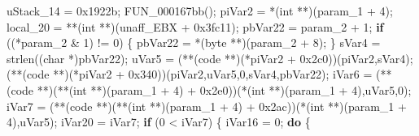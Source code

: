 \documentclass[
]{article}
\newenvironment{Shaded}{}{}
\newcommand{\BaseNTok}[1]{\textcolor[rgb]{0.25,0.63,0.44}{#1}}
\newcommand{\ControlFlowTok}[1]{\textcolor[rgb]{0.00,0.44,0.13}{\textbf{#1}}}
\newcommand{\DataTypeTok}[1]{\textcolor[rgb]{0.56,0.13,0.00}{#1}}
\newcommand{\DecValTok}[1]{\textcolor[rgb]{0.25,0.63,0.44}{#1}}
\newcommand{\NormalTok}[1]{#1}
\newcommand{\OperatorTok}[1]{\textcolor[rgb]{0.40,0.40,0.40}{#1}}
\begin{document}
\begin{Shaded}
\begin{Highlighting}[]
\NormalTok{  uStack\_14 }\OperatorTok{=} \BaseNTok{0x1922b}\OperatorTok{;}
\NormalTok{  FUN\_000167bb}\OperatorTok{();}
\NormalTok{  piVar2 }\OperatorTok{=} \OperatorTok{*(}\DataTypeTok{int} \OperatorTok{**)(}\NormalTok{param\_1 }\OperatorTok{+} \DecValTok{4}\OperatorTok{);}
\NormalTok{  local\_20 }\OperatorTok{=} \OperatorTok{**(}\DataTypeTok{int} \OperatorTok{**)(}\NormalTok{unaff\_EBX }\OperatorTok{+} \BaseNTok{0x3fc11}\OperatorTok{);}
\NormalTok{  pbVar22 }\OperatorTok{=}\NormalTok{ param\_2 }\OperatorTok{+} \DecValTok{1}\OperatorTok{;}
  \ControlFlowTok{if} \OperatorTok{((*}\NormalTok{param\_2 }\OperatorTok{\&} \DecValTok{1}\OperatorTok{)} \OperatorTok{!=} \DecValTok{0}\OperatorTok{)} \OperatorTok{\{}
\NormalTok{    pbVar22 }\OperatorTok{=} \OperatorTok{*(}\NormalTok{byte }\OperatorTok{**)(}\NormalTok{param\_2 }\OperatorTok{+} \DecValTok{8}\OperatorTok{);}
  \OperatorTok{\}}
\NormalTok{  sVar4 }\OperatorTok{=}\NormalTok{ strlen}\OperatorTok{((}\DataTypeTok{char} \OperatorTok{*)}\NormalTok{pbVar22}\OperatorTok{);}
\NormalTok{  uVar5 }\OperatorTok{=} \OperatorTok{(**(}\NormalTok{code }\OperatorTok{**)(*}\NormalTok{piVar2 }\OperatorTok{+} \BaseNTok{0x2c0}\OperatorTok{))(}\NormalTok{piVar2}\OperatorTok{,}\NormalTok{sVar4}\OperatorTok{);}
  \OperatorTok{(**(}\NormalTok{code }\OperatorTok{**)(*}\NormalTok{piVar2 }\OperatorTok{+} \BaseNTok{0x340}\OperatorTok{))(}\NormalTok{piVar2}\OperatorTok{,}\NormalTok{uVar5}\OperatorTok{,}\DecValTok{0}\OperatorTok{,}\NormalTok{sVar4}\OperatorTok{,}\NormalTok{pbVar22}\OperatorTok{);}
\NormalTok{  iVar6 }\OperatorTok{=} \OperatorTok{(**(}\NormalTok{code }\OperatorTok{**)(**(}\DataTypeTok{int} \OperatorTok{**)(}\NormalTok{param\_1 }\OperatorTok{+} \DecValTok{4}\OperatorTok{)} \OperatorTok{+} \BaseNTok{0x2e0}\OperatorTok{))(*(}\DataTypeTok{int} \OperatorTok{**)(}\NormalTok{param\_1 }\OperatorTok{+} \DecValTok{4}\OperatorTok{),}\NormalTok{uVar5}\OperatorTok{,}\DecValTok{0}\OperatorTok{);}
\NormalTok{  iVar7 }\OperatorTok{=} \OperatorTok{(**(}\NormalTok{code }\OperatorTok{**)(**(}\DataTypeTok{int} \OperatorTok{**)(}\NormalTok{param\_1 }\OperatorTok{+} \DecValTok{4}\OperatorTok{)} \OperatorTok{+} \BaseNTok{0x2ac}\OperatorTok{))(*(}\DataTypeTok{int} \OperatorTok{**)(}\NormalTok{param\_1 }\OperatorTok{+} \DecValTok{4}\OperatorTok{),}\NormalTok{uVar5}\OperatorTok{);}
\NormalTok{  iVar20 }\OperatorTok{=}\NormalTok{ iVar7}\OperatorTok{;}
  \ControlFlowTok{if} \OperatorTok{(}\DecValTok{0} \OperatorTok{\textless{}}\NormalTok{ iVar7}\OperatorTok{)} \OperatorTok{\{}
\NormalTok{    iVar16 }\OperatorTok{=} \DecValTok{0}\OperatorTok{;}
    \ControlFlowTok{do} \OperatorTok{\{}

\end{Highlighting}
\end{Shaded}
\end{document}

